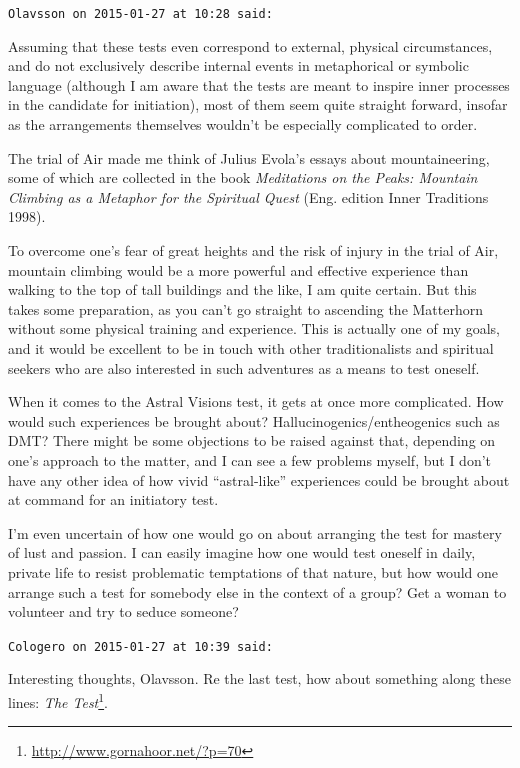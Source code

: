 \begin{footnotesize}
\begin{sffamily}
\hfill

\texttt{Olavsson on 2015-01-27 at 10:28 said:}

Assuming that these tests even correspond to external, physical circumstances, and do not exclusively describe internal events in metaphorical or symbolic language (although I am aware that the tests are meant to inspire inner processes in the candidate for initiation), most of them seem quite straight forward, insofar as the arrangements themselves wouldn't be especially complicated to order.

The trial of Air made me think of Julius Evola's essays about mountaineering, some of which are collected in the book \textit{Meditations on the Peaks: Mountain Climbing as a Metaphor for the Spiritual Quest} (Eng. edition Inner Traditions 1998).

To overcome one's fear of great heights and the risk of injury in the trial of Air, mountain climbing would be a more powerful and effective experience than walking to the top of tall buildings and the like, I am quite certain. But this takes some preparation, as you can't go straight to ascending the Matterhorn without some physical training and experience. This is actually one of my goals, and it would be excellent to be in touch with other traditionalists and spiritual seekers who are also interested in such adventures as a means to test oneself.

When it comes to the Astral Visions test, it gets at once more complicated. How would such experiences be brought about? Hallucinogenics/entheogenics such as DMT? There might be some objections to be raised against that, depending on one's approach to the matter, and I can see a few problems myself, but I don't have any other idea of how vivid ``astral-like'' experiences could be brought about at command for an initiatory test.

I'm even uncertain of how one would go on about arranging the test for mastery of lust and passion. I can easily imagine how one would test oneself in daily, private life to resist problematic temptations of that nature, but how would one arrange such a test for somebody else in the context of a group? Get a woman to volunteer and try to seduce someone?

\hfill

\texttt{Cologero on 2015-01-27 at 10:39 said:}

Interesting thoughts, Olavsson. Re the last test, how about something along these lines: \textit{The Test}\footnote{\url{http://www.gornahoor.net/?p=70}}.


\end{sffamily}
\end{footnotesize}
